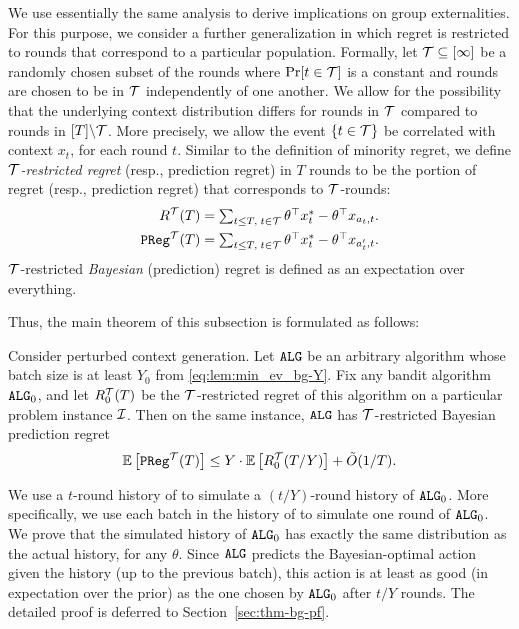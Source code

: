 We use essentially the same analysis to derive implications on group externalities.
For this purpose, we consider a further generalization in which regret is restricted to rounds that correspond to a particular population.
Formally, let $\mathcal{T} \subseteq [\infty]$ be a randomly chosen subset of the rounds where
$\Pr[t \in \mathcal{T}]$ is a constant and rounds are chosen to be in $\mathcal{T}$ independently of
one another. We allow for the possibility that the underlying context
distribution differs for rounds in $\mathcal{T}$ compared to rounds in $[T] \backslash \mathcal{T}$. More precisely, we allow the event $\{t\in \mathcal{T}\}$ be correlated with context $x_t$, for each round $t$. Similar to the definition of minority regret, we define \emph{$\mathcal{T}$-restricted regret} (resp., prediction regret)
in $T$ rounds to be the portion of regret (resp., prediction regret) that corresponds to $\mathcal{T}$-rounds:
\begin{align}
  R^{{\mathcal{T}}}(T)
    &= \textstyle
    \sum_{t\leq T,\;t\in \mathcal{T}} \theta^{\top} x_t^* - \theta^{\top} x_{a_t, t}.
        \label{eq:restricted-regret-def} \\
  \mathtt{PReg}^{{\mathcal{T}}}(T) &= \textstyle
    \sum_{t\leq T,\;t\in \mathcal{T}} \theta^{\top} x_t^* -
\theta^{\top} x_{a'_t, t}.
    \label{eq:restricted-regret-def-pred}
\end{align}
$\mathcal{T}$-restricted \emph{Bayesian} (prediction) regret is defined as
an expectation over everything.

Thus, the main theorem of this subsection is formulated as follows:

\begin{theorem}
  Consider perturbed context generation. Let $\mathtt{ALG}$ be an arbitrary \GreedyStyle
  algorithm whose batch size is at least $Y_0$ from \eqref{eq:lem:min_ev_bg-Y}.
Fix any bandit algorithm $\mathtt{ALG}_0$, and let
    $R^{{\mathcal{T}}}_0(T)$
be the $\mathcal{T}$-restricted regret of this algorithm on a particular problem
instance $\mathcal{I}$. Then on the same instance, $\mathtt{ALG}$ has $\mathcal{T}$-restricted Bayesian prediction regret
\begin{align}\label{eq:thm:bg}
  \mathbb{E}\left[\mathtt{PReg}^{{\mathcal{T}}}(T)\right] \leq Y \cdot \mathbb{E}\left[R^{{\mathcal{T}}}_0(T/Y)\right] + \tilde O(1/T).
\end{align}
\label{thm:bg}
\end{theorem}

 We use a $t$-round history of \ALG to simulate a $(t/Y)$-round history of $\mathtt{ALG}_0$. More specifically, we use each batch in the history of \ALG to simulate one round of $\mathtt{ALG}_0$. We prove that the simulated history of $\mathtt{ALG}_0$ has exactly the same distribution as the actual history, for any $\theta$. Since $\mathtt{ALG}$ predicts the Bayesian-optimal action  given the history (up to the previous batch), this action is at least as good (in expectation over the prior) as the one chosen by $\mathtt{ALG}_0$ after $t/Y$ rounds. The detailed proof is deferred to Section~\ref{sec:thm-bg-pf}.

